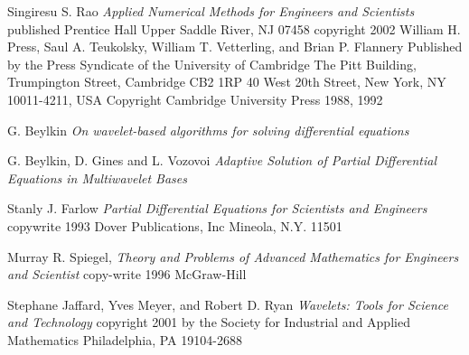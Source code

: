 \documentclass[11pt]{article}
\begin{document}
\begin{thebibliography}{99}
 Singiresu S. Rao \textsl{Applied Numerical Methods for Engineers and Scientists}  published Prentice Hall Upper Saddle River, NJ 07458 copyright  2002
 William H. Press, Saul A. Teukolsky, William T. Vetterling, and Brian P. Flannery Published by the Press Syndicate of the University of Cambridge The Pitt Building, Trumpington Street, Cambridge CB2 1RP
40 West 20th Street, New York, NY 10011-4211, USA
Copyright Cambridge University Press 1988, 1992




  G. Beylkin \textsl{On wavelet-based algorithms for solving differential equations}

  G. Beylkin, D. Gines and L. Vozovoi \textsl{Adaptive Solution of Partial Differential Equations in Multiwavelet Bases }

 Stanly J. Farlow \textsl{Partial Differential Equations for Scientists and Engineers} copywrite 1993 Dover Publications, Inc Mineola, N.Y. 11501

 Murray R. Spiegel, \textsl { Theory and Problems of Advanced Mathematics for Engineers and Scientist} copy-write 1996 McGraw-Hill 

 Stephane Jaffard, Yves Meyer, and Robert D. Ryan \textsl {Wavelets: Tools for Science and Technology} copyright 2001 by the Society for Industrial and Applied Mathematics Philadelphia, PA 19104-2688

\end {thebibliography}



 
\end{document}
